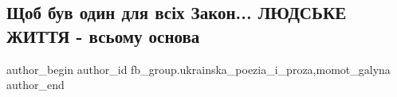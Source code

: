  
 
 
 
 

\subsection{Щоб був один для всіх Закон... ЛЮДСЬКЕ ЖИТТЯ - всьому основа}
\label{sec:14_01_2023.fb.fb_group.ukrainska_poezia_i_proza.2.shchob_buv_odin_dlya}
 
\ifcmt
 author_begin
   author_id fb_group.ukrainska_poezia_i_proza,momot_galyna
 author_end
\fi

